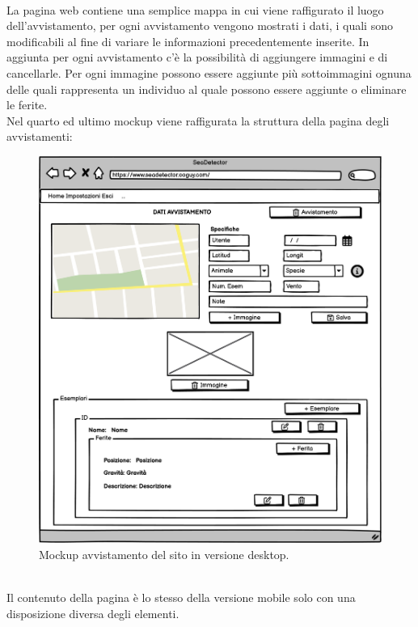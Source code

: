 \documentclass[a4paper,final,12pt]{report}
\begin{document}
\\La pagina web contiene una semplice mappa in cui viene raffigurato il luogo dell'avvistamento, per ogni avvistamento vengono mostrati i dati, i quali sono modificabili al fine di variare le informazioni precedentemente inserite. In aggiunta per ogni avvistamento c'è la possibilità di aggiungere immagini e di cancellarle. Per ogni immagine possono essere aggiunte più sottoimmagini ognuna delle quali rappresenta un individuo al quale possono essere aggiunte o eliminare le ferite.\\
Nel quarto ed ultimo mockup viene raffigurata la struttura della pagina degli avvistamenti:
\begin{figure}[hbtp]
\centering
\includegraphics[scale=0.47]{img_concettuale/avvistamentoDesk.png}
\caption{Mockup avvistamento del sito in versione desktop.}
\end{figure}
\\Il contenuto della pagina è lo stesso della versione mobile solo con una disposizione diversa degli elementi.
\end{document}
